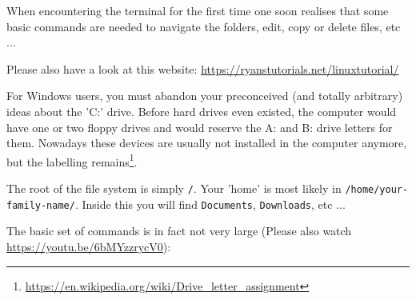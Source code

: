 When encountering the terminal for the first time one soon realises that some basic commands 
are needed to navigate the folders, edit, copy or delete files, etc ... 

Please also have a look at this website: \url{https://ryanstutorials.net/linuxtutorial/}

For Windows users, you must abandon your preconceived (and totally arbitrary) ideas about the 
'C:' drive. Before hard drives even existed, the computer would have one or two floppy drives
and would reserve the A: and B: drive letters for them. Nowadays these devices are usually not installed 
in the computer anymore, but the labelling remains\footnote{\url{https://en.wikipedia.org/wiki/Drive_letter_assignment}}. 

The root of the file system is simply {\tt /}. Your 'home' is most likely in {\tt /home/your-family-name/}. Inside 
this you will find {\tt Documents}, {\tt Downloads}, etc ...

The basic set of commands is in fact not very large (Please also watch \url{https://youtu.be/6bMYzzrycV0}):

